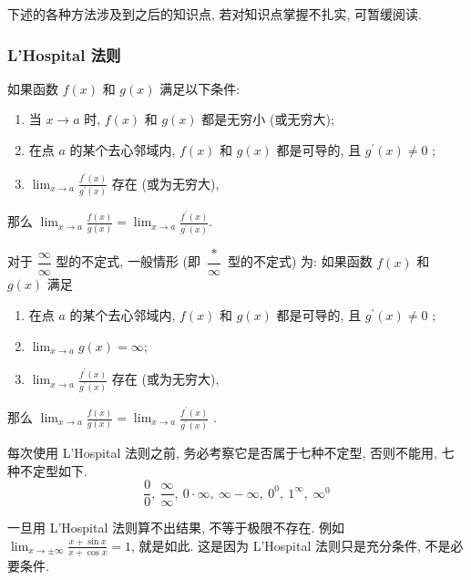 下述的各种方法涉及到之后的知识点, 若对知识点掌握不扎实, 可暂缓阅读.

\subsubsection{L'Hospital 法则}

\begin{theorem}
    如果函数 $f(x)$ 和 $g(x)$ 满足以下条件:\label{LHospitalLaw}
    \begin{enumerate}[label=(\arabic{*})]
        \item 当 $ x \rightarrow a $ 时, $f(x) $ 和 $ g(x) $ 都是无穷小 (或无穷大);
        \item 在点 $ a $ 的某个去心邻域内, $f(x) $ 和 $ g(x) $ 都是可导的, 且 $ g^{\prime}(x) \neq 0$ ;
        \item $\displaystyle\lim _{x \rightarrow a} \frac{f^{\prime}(x)}{g^{\prime}(x)} $ 存在 (或为无穷大),
    \end{enumerate}
    那么 $ \displaystyle\lim _{x \rightarrow a} \frac{f(x)}{g(x)}=\lim _{x \rightarrow a} \frac{f^{\prime}(x)}{g^{\prime}(x)} .$
\end{theorem}

\begin{theorem}
    对于 $ \dfrac{\infty}{\infty} $ 型的不定式, 一般情形 (即 $ \dfrac{*}{\infty} $ 型的不定式) 为: 如果函数 $ f(x) $ 和 $ g(x) $ 满足
    \begin{enumerate}[label=(\arabic{*})]
        \item 在点 $ a $ 的某个去心邻域内, $f(x) $ 和 $ g(x) $ 都是可导的, 且 $ g^{\prime}(x) \neq 0$ ;
        \item $\displaystyle\lim _{x \rightarrow a} g(x)=\infty $;
        \item $\displaystyle\lim _{x \rightarrow a} \frac{f^{\prime}(x)}{g^{\prime}(x)} $ 存在 (或为无穷大),
    \end{enumerate}
    那么 $\displaystyle \lim _{x \rightarrow a} \frac{f(x)}{g(x)}=\lim _{x \rightarrow a} \frac{f^{\prime}(x)}{g^{\prime}(x)}$ .
\end{theorem}

每次使用 L'Hospital 法则之前, 务必考察它是否属于七种不定型, 否则不能用, 七种不定型如下.
$$\frac{0}{0},~\frac{\infty}{\infty},~0\cdot\infty,~\infty-\infty,~0^0,~1^\infty,~\infty^0$$

一旦用 L'Hospital 法则算不出结果, 不等于极限不存在. 例如 $\displaystyle\lim_{x\to\pm\infty}\frac{x+\sin x}{x+\cos x}=1$,
就是如此. 这是因为 L'Hospital 法则只是充分条件, 不是必要条件.

